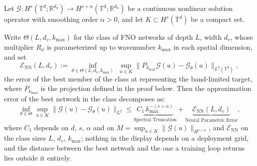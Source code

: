 \begin{theorem}
\label{thm:fno_convergence}
Let $\mathcal{G} : H^s(\mathbb{T}^d; \mathbb{R}^{d_a}) \to H^{s+\alpha}(\mathbb{T}^d; \mathbb{R}^{d_u})$ be a continuous nonlinear solution operator with smoothing order $\alpha > 0$, and let $K \subset H^s(\mathbb{T}^d)$ be a compact set.

Write $\Theta(L, d_v, k_{\max})$ for the class of FNO networks of depth $L$, width $d_v$, whose multiplier $R_{\phi}$ is parameterized up to wavenumber $k_{\max}$ in each spatial dimension, and set
\begin{equation}
  \label{eq:ch05-enn-def}
  \mathcal{E}_{\text{NN}}(L, d_v) := \inf_{\theta \in \Theta(L, d_v, k_{\max})} \; \sup_{u \in K} \big\| P_{k_{\max}} \mathcal{G}(u) - \mathcal{G}_\theta(u) \big\|_{L^2(\mathbb{T}^d)},
\end{equation}
the error of the best member of the class at representing the band-limited target, where $P_{k_{\max}}$ is the projection defined in the proof below. Then the approximation error of the best network in the class decomposes as:
\begin{equation}
  \label{eq:ch05-error-decomposition}
  \inf_{\theta \in \Theta} \sup_{u \in K} \|\mathcal{G}(u) - \mathcal{G}_\theta(u)\|_{L^2} \le \underbrace{C_1 \, k_{\max}^{-(s+\alpha)}}_{\text{Spectral Truncation}} + \underbrace{\mathcal{E}_{\text{NN}}(L, d_v)}_{\text{Neural Parametric Error}},
\end{equation}
where $C_1$ depends on $d$, $s$, $\alpha$ and on $M = \sup_{u \in K} \|\mathcal{G}(u)\|_{H^{s+\alpha}}$, and $\mathcal{E}_{\text{NN}}$ on the class sizes $L$, $d_v$, $k_{\max}$; nothing in the display depends on a deployment grid, and the distance between the best network and the one a training loop returns lies outside it entirely.
\end{theorem}


